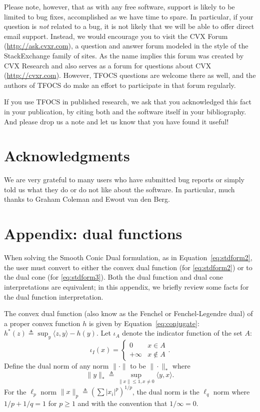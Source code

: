 \documentclass{article}
\newcommand{\<}{\langle}
\renewcommand{\>}{\rangle}
\begin{document}
Please note, however, that as with any free software, support is likely to
be limited to bug fixes, accomplished as we have time to spare. In particular,
if your question is \emph{not} related to a bug, it is not likely that 
we will be able to offer direct email support. Instead, we would encourage
you to visit the CVX Forum (\url{http://ask.cvxr.com}), a question and
answer forum modeled in the style of the StackExchange family of sites.
As the name implies this forum was created by CVX Research and also
serves as a forum for questions about CVX (\url{http://cvxr.com}).
However, TFOCS questions are welcome there as well, and the authors
of TFOCS do make an effort to participate in that forum regularly.

If you use TFOCS in published research, we ask that you acknowledged
this fact in your publication, by citing both \cite{TFOCS} and the
software itself in your bibliography. And please
drop us a note and let us know that you have found it useful!

\section{Acknowledgments}
We are very grateful to many users who have submitted bug reports
or simply told us what they do or do not like about the software.
In particular, much thanks to Graham Coleman and Ewout van den Berg.

\section{Appendix: dual functions}
\label{sec:appendix}

When solving the Smooth Conic Dual formulation, as in Equation~\eqref{eq:stdform2},
the user must convert to either the convex dual function (for \eqref{eq:stdform2})
or to the dual cone (for \eqref{eq:stdform3}). Both the dual function and dual cone
interpretations are equivalent; in this appendix, we briefly review some facts
for the dual function interpretation.

The convex dual function (also know as the Fenchel or Fenchel-Legendre dual)
of a proper convex function $h$ is given by Equation~\eqref{eq:conjugate}:
$ h^*(z) \triangleq \textstyle \sup_y \<z,y\> - h(y) $.
Let $\iota_A$ denote the indicator function of the set $A$:
$$ \iota_I(x) = \begin{cases} 0 & x \in A \\ +\infty & x \notin A \end{cases}.$$
Define the dual norm of any norm $\|\cdot\|$ to be $\|\cdot\|_*$ where
$$ \|y\|_* \triangleq \sup_{ \|x\| \le 1, x \neq 0} \< y, x \>.$$
For the $\ell_p$ norm $\|x\|_p \triangleq (\sum |x_i|^p )^{1/p} $,
the dual norm is the $\ell_q$ norm where $1/p + 1/q = 1$ for $p \ge 1$
and with the convention that $1/\infty = 0$.
\end{document}

